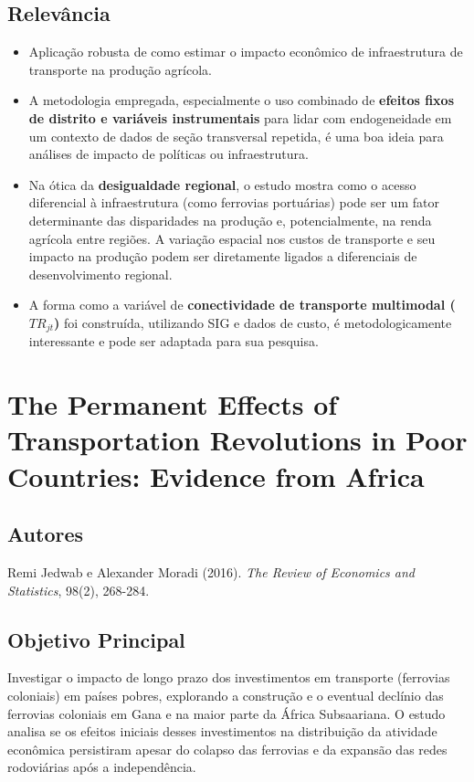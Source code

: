 \documentclass[12pt]{article}
\begin{document}
\subsection*{Relevância}
\begin{itemize}
    \item Aplicação robusta de como estimar o impacto econômico de infraestrutura de transporte na produção agrícola.
    \item A metodologia empregada, especialmente o uso combinado de \textbf{efeitos fixos de distrito e variáveis instrumentais} para lidar com endogeneidade em um contexto de dados de seção transversal repetida, é uma boa ideia para análises de impacto de políticas ou infraestrutura.
    \item Na ótica da \textbf{desigualdade regional}, o estudo mostra como o acesso diferencial à infraestrutura (como ferrovias portuárias) pode ser um fator determinante das disparidades na produção e, potencialmente, na renda agrícola entre regiões. A variação espacial nos custos de transporte e seu impacto na produção podem ser diretamente ligados a diferenciais de desenvolvimento regional.
    \item A forma como a variável de \textbf{conectividade de transporte multimodal ($TR_{jt}$)} foi construída, utilizando SIG e dados de custo, é metodologicamente interessante e pode ser adaptada para sua pesquisa.
\end{itemize}

\newpage
 \section{The Permanent Effects of Transportation Revolutions in Poor Countries: Evidence from Africa}

\subsection*{Autores}
Remi Jedwab e Alexander Moradi (2016). \textit{The Review of Economics and Statistics}, 98(2), 268-284.

\subsection*{Objetivo Principal}
Investigar o impacto de longo prazo dos investimentos em transporte (ferrovias coloniais) em países pobres, explorando a construção e o eventual declínio das ferrovias coloniais em Gana e na maior parte da África Subsaariana. O estudo analisa se os efeitos iniciais desses investimentos na distribuição da atividade econômica persistiram apesar do colapso das ferrovias e da expansão das redes rodoviárias após a independência.
\end{document}
